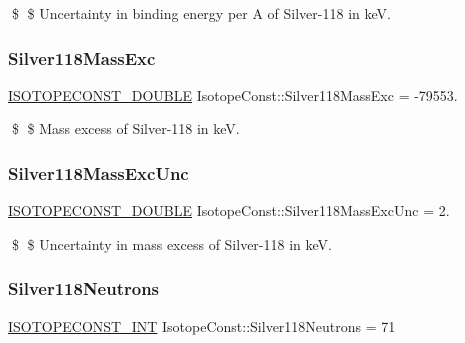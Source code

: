 \$ \$ Uncertainty in binding energy per A of Silver-\/118 in keV. \mbox{\label{group___isotope_const-_silver-_ag118_gab5717cb1820d49f1d74b11f8ef189685}} 
\subsubsection{\texorpdfstring{Silver118\+Mass\+Exc}{Silver118MassExc}}
{\footnotesize\ttfamily \mbox{\hyperlink{group___isotope_const-_macros_ga8f45a7272ce02c0b4c65c44636ed719a}{I\+S\+O\+T\+O\+P\+E\+C\+O\+N\+S\+T\+\_\+\+D\+O\+U\+B\+LE}} Isotope\+Const\+::\+Silver118\+Mass\+Exc = -\/79553.}

\$ \$ Mass excess of Silver-\/118 in keV. \mbox{\label{group___isotope_const-_silver-_ag118_ga62815fe4bf750348977bfcbafc3164d9}} 
\subsubsection{\texorpdfstring{Silver118\+Mass\+Exc\+Unc}{Silver118MassExcUnc}}
{\footnotesize\ttfamily \mbox{\hyperlink{group___isotope_const-_macros_ga8f45a7272ce02c0b4c65c44636ed719a}{I\+S\+O\+T\+O\+P\+E\+C\+O\+N\+S\+T\+\_\+\+D\+O\+U\+B\+LE}} Isotope\+Const\+::\+Silver118\+Mass\+Exc\+Unc = 2.}

\$ \$ Uncertainty in mass excess of Silver-\/118 in keV. \mbox{\label{group___isotope_const-_silver-_ag118_ga5b0e595282b94575b5a8c461bd27284b}} 
\subsubsection{\texorpdfstring{Silver118\+Neutrons}{Silver118Neutrons}}
{\footnotesize\ttfamily \mbox{\hyperlink{group___isotope_const-_macros_ga5f18360b3e99483a35c32d789e62621c}{I\+S\+O\+T\+O\+P\+E\+C\+O\+N\+S\+T\+\_\+\+I\+NT}} Isotope\+Const\+::\+Silver118\+Neutrons = 71}

